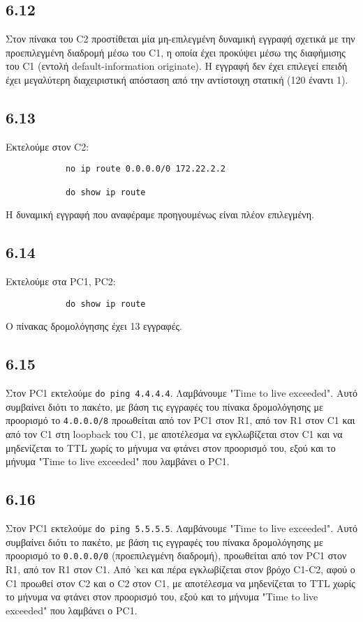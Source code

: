 \documentclass[a4paper, 12pt]{article}
\begin{document}
	\subsection*{6.12}
		Στον πίνακα του C2 προστίθεται μία μη-επιλεγμένη δυναμική εγγραφή σχετικά με την προεπιλεγμένη διαδρομή μέσω του C1, η οποία έχει προκύψει μέσω της διαφήμισης του C1 (εντολή default-information originate). Η εγγραφή δεν έχει επιλεγεί επειδή έχει μεγαλύτερη διαχειριστική απόσταση από την αντίστοιχη στατική (120 έναντι 1).

	\subsection*{6.13}
		Εκτελούμε στον C2: 
		
		\begin{verbatim}
			no ip route 0.0.0.0/0 172.22.2.2
			
			do show ip route
		\end{verbatim}
		
		Η δυναμική εγγραφή που αναφέραμε προηγουμένως είναι πλέον επιλεγμένη.

	\subsection*{6.14}
		Εκτελούμε στα PC1, PC2:
		
		\begin{verbatim}
			do show ip route
		\end{verbatim}
		
		Ο πίνακας δρομολόγησης έχει 13 εγγραφές.

	\subsection*{6.15}
		Στον PC1 εκτελούμε \verb|do ping 4.4.4.4|. Λαμβάνουμε "Time to live exceeded". Αυτό συμβαίνει διότι το πακέτο, με βάση τις εγγραφές του πίνακα δρομολόγησης με προορισμό το \verb|4.0.0.0/8| προωθείται από τον PC1 στον R1, από τον R1 στον C1 και από τον C1 στη loopback του C1, με αποτέλεσμα να εγκλωβίζεται στον C1 και να μηδενίζεται το TTL χωρίς το μήνυμα να φτάνει στον προορισμό του, εξού και το μήνυμα "Time to live exceeded" που λαμβάνει ο PC1.

	\subsection*{6.16}
		Στον PC1 εκτελούμε \verb|do ping 5.5.5.5|. Λαμβάνουμε "Time to live exceeded". Αυτό συμβαίνει διότι το πακέτο, με βάση τις εγγραφές του πίνακα δρομολόγησης με προορισμό το \verb|0.0.0.0/0| (προεπιλεγμένη διαδρομή), προωθείται από τον PC1 στον R1, από τον R1 στον C1. Από 'κει και πέρα εγκλωβίζεται στον βρόχο C1-C2, αφού ο C1 προωθεί στον C2 και ο C2 στον C1, με αποτέλεσμα να μηδενίζεται το TTL χωρίς το μήνυμα να φτάνει στον προορισμό του, εξού και το μήνυμα "Time to live exceeded" που λαμβάνει ο PC1.
\end{document}
